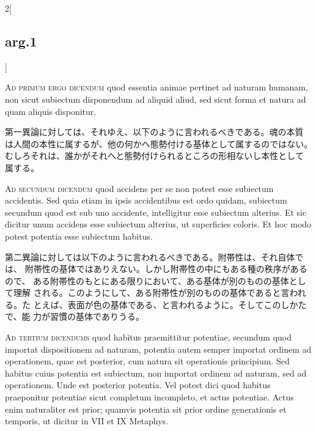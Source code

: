 \documentclass[paper=a4paper,fontsize=10pt,jafontsize=9pt,titlepage]{jlreq}
\begin{document}
\begin{paracol}{2}[\subsection{arg.1}]

{\scshape Ad primum ergo dicendum} quod essentia animae pertinet ad naturam
humanam, non sicut subiectum disponendum ad aliquid aliud, sed sicut
forma et natura ad quam aliquis disponitur.

\switchcolumn

第一異論に対しては、それゆえ、以下のように言われるべきである。魂の本質
は人間の本性に属するが、他の何かへ態勢付ける基体として属するのではない。
むしろそれは、誰かがそれへと態勢付けられるところの形相ないし本性として
属する。

\switchcolumn*[\subsection{ad.2}]

{\scshape Ad secundum dicendum} quod accidens per se non potest esse subiectum
accidentis. Sed quia etiam in ipsis accidentibus est ordo quidam,
subiectum secundum quod est sub uno accidente, intelligitur esse
subiectum alterius. Et sic dicitur unum accidens esse subiectum
alterius, ut superficies coloris. Et hoc modo potest potentia esse
subiectum habitus.

\switchcolumn

第二異論に対しては以下のように言われるべきである。附帯性は、それ自体では、
附帯性の基体ではありえない。しかし附帯性の中にもある種の秩序があるので、
ある附帯性のもとにある限りにおいて、ある基体が別のものの基体として理解
される。このようにして、ある附帯性が別のものの基体であると言われる。た
とえば、表面が色の基体である、と言われるように。そしてこのしかたで、能
力が習慣の基体でありうる。

\switchcolumn*[\subsection{ad.3}]

{\scshape Ad tertium dicendums} quod habitus praemittitur potentiae, secundum quod
importat dispositionem ad naturam, potentia autem semper importat
ordinem ad operationem, quae est posterior, cum natura sit operationis
principium. Sed habitus cuius potentia est subiectum, non importat
ordinem ad naturam, sed ad operationem. Unde est posterior
potentia. Vel potest dici quod habitus praeponitur potentiae sicut
completum incompleto, et actus potentiae. Actus enim naturaliter est
prior; quamvis potentia sit prior ordine generationis et temporis, ut
dicitur in VII et IX Metaphys.


\end{paracol}
\end{document}
